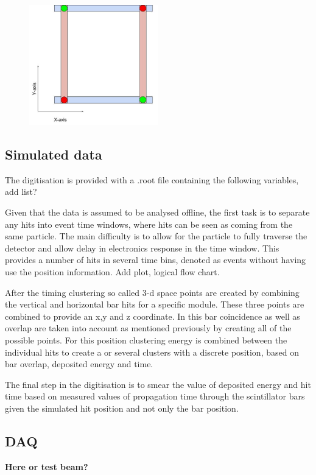 \begin{figure}[h!]
\centering
\includegraphics[width=0.5\textwidth]{figures/BarsAmbi.jpg}
\caption{}
\label{fig:BarAmbi}
\end{figure}

\subsection{Simulated data}

The digitisation is provided with a .root file containing the following variables, add list? 

Given that the data is assumed to be analysed offline, the first task is to separate any hits into event time windows, where hits can be seen as coming from the same particle. The main difficulty is to allow for the particle to fully traverse the detector and allow delay in electronics response in the time window. This provides a number of hits in several time bins, denoted as events without having use the position information. Add plot, logical flow chart.

After the timing clustering so called 3-d space points are created by combining the vertical and horizontal bar hits for a specific module. These three points are combined to provide an x,y and z coordinate. In this bar coincidence as well as overlap are taken into account as mentioned previously by creating all of the possible points. For this position clustering energy is combined between the individual hits to create a or several clusters with a discrete position, based on bar overlap, deposited energy and time.

The final step in the digitisation is to smear the value of deposited energy and hit time based on measured values of propagation time through the scintillator bars given the simulated hit position and not only the bar position.

\subsection{DAQ}
\textbf{Here or test beam?}

